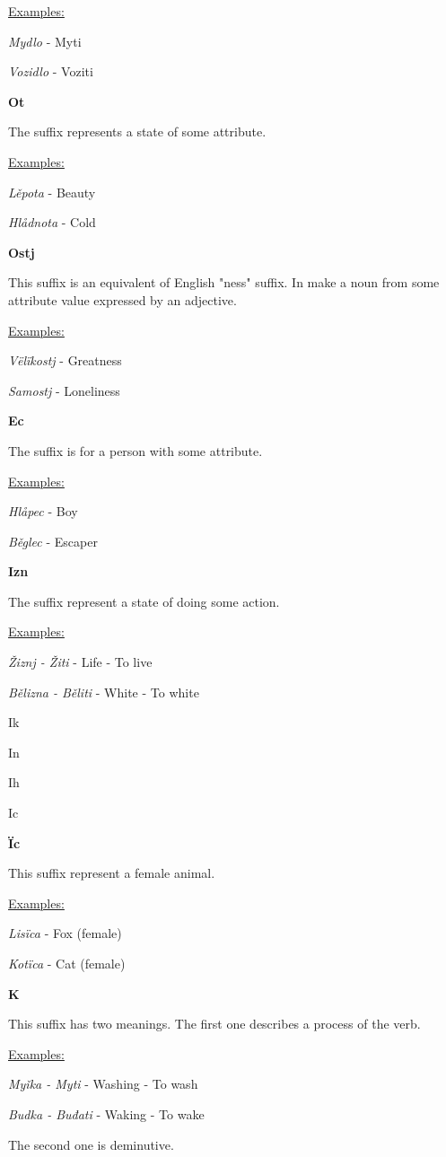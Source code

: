 \underline{Examples:}

\textit{Mydlo} - Myti

\textit{Vozidlo} - Voziti

\textbf{Ot}

The suffix represents a state of some attribute.

\underline{Examples:}

\textit{Lěpota} - Beauty

\textit{Hlådnota} - Cold

\textbf{Ostj}

This suffix is an equivalent of English "ness" suffix. In make a noun from some attribute value expressed by an adjective.

\underline{Examples:}

\textit{Vëlïkostj} - Greatness

\textit{Samostj} - Loneliness

\textbf{Ec}

The suffix is for a person with some attribute.

\underline{Examples:}

\textit{Hlåpec} - Boy

\textit{Běglec} - Escaper

\textbf{Izn}

The suffix represent a state of doing some action.

\underline{Examples:}

\textit{Žiznj - Žiti} - Life - To live

\textit{Bělizna - Běliti} - White - To white

Ik

In

Ih

Ic

\textbf{Ïc}

This suffix represent a female animal.

\underline{Examples:}

\textit{Lisïca} - Fox (female)

\textit{Kotïca} - Cat (female)

\textbf{K}

This suffix has two meanings. The first one describes a process of the verb. 

\underline{Examples:}

\textit{Myǐka - Myti} - Washing - To wash

\textit{Budka - Buđati} - Waking - To wake

The second one is deminutive.

